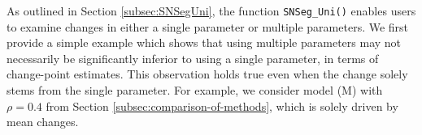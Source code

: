 


{As outlined in Section \ref{subsec:SNSegUni}, the function \texttt{SNSeg\_Uni()} enables users to examine changes in either a single parameter or multiple parameters. We first provide a simple example which shows that using multiple parameters may not necessarily be significantly inferior to using a single parameter, in terms of change-point estimates.  This observation holds true even when the change solely stems from the single parameter. For example, we consider model (M) with $\rho=0.4$ from Section \ref{subsec:comparison-of-methods}, which is solely driven by mean changes. }


